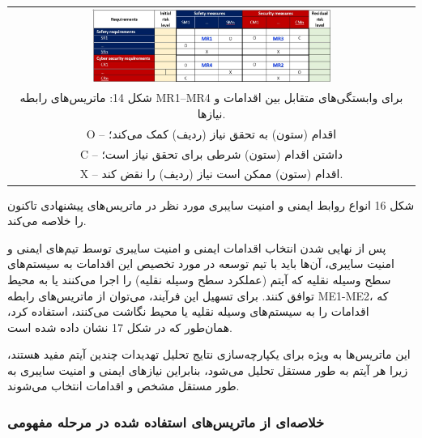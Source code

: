 \documentclass[a4paper,10pt]{article}
\begin{document}
                \begin{table}
            
                    \centering
                    \begin{tabular}{ c }
                        
                        \includegraphics[width=0.6\textwidth]{Image/fig14.jpg} \\
        
                        شکل 14: ماتریس‌های رابطه MR1–MR4 برای وابستگی‌های متقابل بین اقدامات و نیازها.\\
                        
                        O – اقدام (ستون) به تحقق نیاز (ردیف) کمک می‌کند؛\\
                        
                        C – داشتن اقدام (ستون) شرطی برای تحقق نیاز است؛\\
                        
                        X – اقدام (ستون) ممکن است نیاز (ردیف) را نقض کند.
        
                    \end{tabular}
        
                \end{table}

                شکل 16 انواع روابط ایمنی و امنیت سایبری مورد نظر در ماتریس‌های پیشنهادی تاکنون را خلاصه می‌کند.

                پس از نهایی شدن انتخاب اقدامات ایمنی و امنیت سایبری توسط تیم‌های ایمنی و امنیت سایبری، آن‌ها باید با تیم توسعه در مورد تخصیص این اقدامات به سیستم‌های سطح وسیله نقلیه که آیتم (عملکرد سطح وسیله نقلیه) را اجرا می‌کنند یا به محیط توافق کنند. برای تسهیل این فرآیند، می‌توان از ماتریس‌های رابطه ME1-ME2، که اقدامات را به سیستم‌های وسیله نقلیه یا محیط نگاشت می‌کنند، استفاده کرد، همان‌طور که در شکل 17 نشان داده شده است.

                این ماتریس‌ها به ویژه برای یکپارچه‌سازی نتایج تحلیل تهدیدات چندین آیتم مفید هستند، زیرا هر آیتم به طور مستقل تحلیل می‌شود، بنابراین نیازهای ایمنی و امنیت سایبری به طور مستقل مشخص و اقدامات انتخاب می‌شوند.

            \subsubsection{خلاصه‌ای از ماتریس‌های استفاده شده در مرحله مفهومی}
\end{document}
